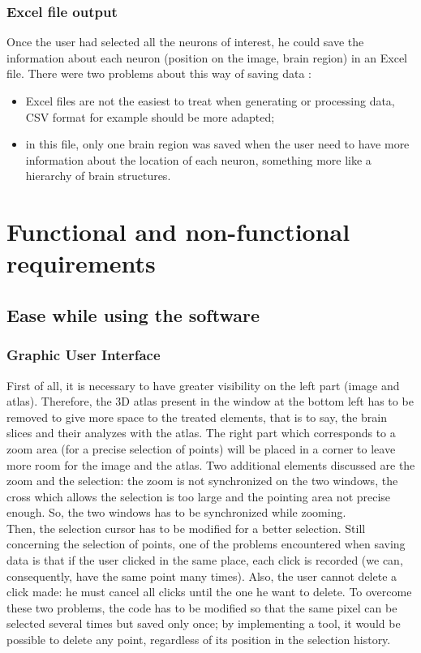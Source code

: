 \documentclass[a4paper,12pt]{report}
\begin{document}
\subsubsection{Excel file output}
Once the user had selected all the neurons of interest, he could save the information about each neuron (position on the image, brain region) in an Excel file. There were two problems about this way of saving data :
\begin{itemize}
    \item Excel files are not the easiest to treat when generating or processing data, CSV format for example should be more adapted;
    \item in this file, only one brain region was saved when the user need to have more information about the location of each neuron, something more like a hierarchy of brain structures.  \\
\end{itemize}

\section{Functional and non-functional requirements}
\subsection{Ease while using the software}
\subsubsection{Graphic User Interface}
First of all, it is necessary to have greater visibility on the left part (image and atlas). Therefore, the 3D atlas present in the window at the bottom left has to be removed to give more space to the treated elements, that is to say, the brain slices and their analyzes with the atlas. The right part which corresponds to a zoom area (for a precise selection of points) will be placed in a corner to leave more room for the image and the atlas. Two additional elements discussed are the zoom and the selection: the zoom is not synchronized on the two windows, the cross which allows the selection is too large and the pointing area not precise enough. So, the two windows has to be synchronized while zooming. \\

Then, the selection cursor has to be modified for a better selection. Still concerning the selection of points, one of the problems encountered when saving data is that if the user clicked in the same place, each click is recorded (we can, consequently, have the same point many times). Also, the user cannot delete a click made: he must cancel all clicks until the one he want to delete. To overcome these two problems, the code has to be modified so that the same pixel can be selected several times but saved only once; by implementing a tool, it would be possible to delete any point, regardless of its position in the selection history. \\
\end{document}
